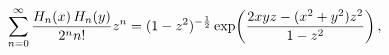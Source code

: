 \[\sum_{n=0}^{\infty}\frac{\mathop{H_{n}\/}\nolimits\!\left(x\right)\mathop{H_{n%
}\/}\nolimits\!\left(y\right)}{2^{n}n!}z^{n}=(1-z^{2})^{-\frac{1}{2}}\mathop{%
\exp\/}\nolimits\!\left(\frac{2xyz-(x^{2}+y^{2})z^{2}}{1-z^{2}}\right),\]